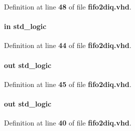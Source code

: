 Definition at line {\bf 48} of file {\bf fifo2diq.\+vhd}.

\paragraph[{fifo\+\_\+rdempty}]{ {\bfseries \textcolor{keywordflow}{in}\textcolor{vhdlchar}{ }} {\bfseries \textcolor{comment}{std\+\_\+logic}\textcolor{vhdlchar}{ }} \hspace{0.3cm}{\ttfamily [Port]}}\label{classfifo2diq_a76cac3a261ac5629be8971f12b1a9513}


Definition at line {\bf 44} of file {\bf fifo2diq.\+vhd}.

\paragraph[{fifo\+\_\+rdreq}]{ {\bfseries \textcolor{keywordflow}{out}\textcolor{vhdlchar}{ }} {\bfseries \textcolor{comment}{std\+\_\+logic}\textcolor{vhdlchar}{ }} \hspace{0.3cm}{\ttfamily [Port]}}\label{classfifo2diq_a33022075aee14ff50fd52519b92ff28c}


Definition at line {\bf 45} of file {\bf fifo2diq.\+vhd}.

\paragraph[{fsync}]{ {\bfseries \textcolor{keywordflow}{out}\textcolor{vhdlchar}{ }} {\bfseries \textcolor{comment}{std\+\_\+logic}\textcolor{vhdlchar}{ }} \hspace{0.3cm}{\ttfamily [Port]}}\label{classfifo2diq_a2b82fb2251ed5f44aaa2daf192b34e42}


Definition at line {\bf 40} of file {\bf fifo2diq.\+vhd}.

\paragraph[{ieee}]{\hspace{0.3cm}{\ttfamily [Library]}}\label{classfifo2diq_a0a6af6eef40212dbaf130d57ce711256}


